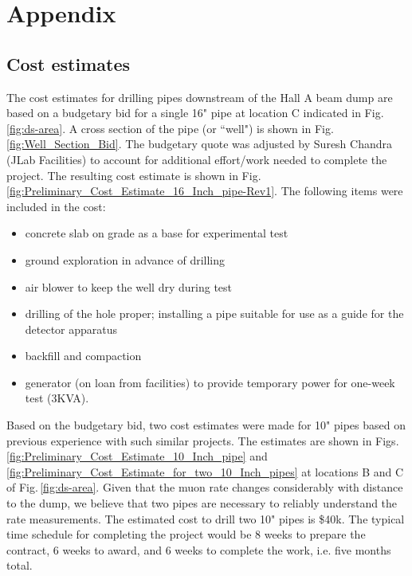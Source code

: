 \section{Appendix}
\label{sec:appx}
\subsection{Cost estimates}

The cost estimates for drilling pipes downstream of the Hall A beam dump are based on a budgetary bid for a single 16" pipe at location C indicated in 
Fig.\,\ref{fig:ds-area}. A cross section of the pipe (or ``well") is shown in Fig.\,\ref{fig:Well_Section_Bid}. 
The budgetary quote was adjusted by Suresh Chandra (JLab Facilities) to account for additional effort/work needed to complete the 
project. The resulting cost estimate is shown in Fig.\,\ref{fig:Preliminary_Cost_Estimate_16_Inch_pipe-Rev1}. The following
items were included in the cost:
\begin{itemize}
\item concrete slab on grade as a base for experimental test
\item ground exploration in advance of drilling
\item air blower to keep the well dry during test
\item drilling of the hole proper; installing a pipe suitable for use as a guide for the detector apparatus
\item backfill and compaction
\item generator (on loan from facilities) to provide temporary power for one-week test (3KVA).
\end{itemize}

Based on the budgetary bid, two cost estimates were made for 10" pipes based on previous experience with such similar projects. The estimates are shown in 
Figs.\ref{fig:Preliminary_Cost_Estimate_10_Inch_pipe} and \ref{fig:Preliminary_Cost_Estimate_for_two_10_Inch_pipes} at locations B and C of  Fig.\,\ref{fig:ds-area}.
Given that the muon rate changes considerably with
distance to the dump, we believe that two pipes are necessary to reliably understand the rate measurements. The estimated cost to drill two 10" pipes is \$40k. 
The typical time schedule for completing the project would be 8 weeks to prepare the contract, 6 weeks to award, and 6 weeks to complete the work, i.e. five months
total.

